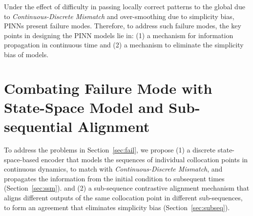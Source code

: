 \documentclass{article}
\theoremstyle{plain}
\theoremstyle{definition}
\theoremstyle{remark}
\begin{document}
Under the effect of difficulty in passing locally correct patterns to the global due to \textit{Continuous-Discrete Mismatch} and over-smoothing due to simplicity bias, PINNs present failure modes. Therefore, to address such failure modes, the key points in designing the PINN models lie in: (1) a mechanism for information propagation in continuous time and (2) a mechanism to eliminate the simplicity bias of models.


















\vspace{-1mm}

\section{Combating Failure Mode with State-Space Model and Sub-sequential Alignment}
\label{sec:ssmsub}


    To address the problems in Section~\ref{sec:fail}, we propose (1) a discrete state-space-based encoder that models the sequences of individual collocation points in continuous dynamics, to match with \textit{Continuous-Discrete Mismatch}, and propagates the information from the initial condition to subsequent times (Section~\ref{sec:ssm}).  and (2) a sub-sequence contrastive alignment mechanism that aligns different outputs of the same collocation point in different sub-sequences, to form an agreement that eliminates simplicity bias (Section~\ref{sec:subseq}).
    
\end{document}
